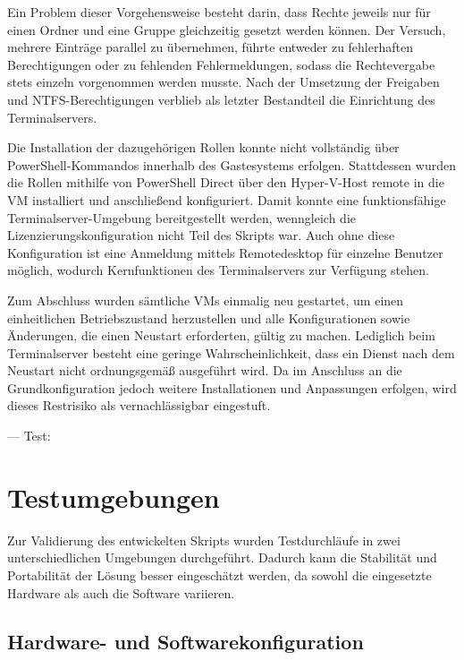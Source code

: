 \documentclass[conference]{IEEEtran}
\begin{document}
Ein Problem dieser Vorgehensweise besteht darin, dass Rechte jeweils nur für einen Ordner und eine Gruppe gleichzeitig gesetzt werden können. Der Versuch, mehrere Einträge parallel zu übernehmen, führte entweder zu fehlerhaften Berechtigungen oder zu fehlenden Fehlermeldungen, sodass die Rechtevergabe stets einzeln vorgenommen werden musste. Nach der Umsetzung der Freigaben und NTFS-Berechtigungen verblieb als letzter Bestandteil die Einrichtung des Terminalservers.

Die Installation der dazugehörigen Rollen konnte nicht vollständig über PowerShell-Kommandos innerhalb des Gastesystems erfolgen. Stattdessen wurden die Rollen mithilfe von PowerShell Direct über den Hyper-V-Host remote in die VM installiert und anschließend konfiguriert. Damit konnte eine funktionsfähige Terminalserver-Umgebung bereitgestellt werden, wenngleich die Lizenzierungskonfiguration nicht Teil des Skripts war. Auch ohne diese Konfiguration ist eine Anmeldung mittels Remotedesktop für einzelne Benutzer möglich, wodurch Kernfunktionen des Terminalservers zur Verfügung stehen.

Zum Abschluss wurden sämtliche VMs einmalig neu gestartet, um einen einheitlichen Betriebszustand herzustellen und alle Konfigurationen sowie Änderungen, die einen Neustart erforderten, gültig zu machen. Lediglich beim Terminalserver besteht eine geringe Wahrscheinlichkeit, dass ein Dienst nach dem Neustart nicht ordnungsgemäß ausgeführt wird. Da im Anschluss an die Grundkonfiguration jedoch weitere Installationen und Anpassungen erfolgen, wird dieses Restrisiko als vernachlässigbar eingestuft.

---
Test:

\chapter{Testumgebungen}

Zur Validierung des entwickelten Skripts wurden Testdurchläufe in zwei unterschiedlichen Umgebungen durchgeführt. Dadurch kann die Stabilität und Portabilität der Lösung besser eingeschätzt werden, da sowohl die eingesetzte Hardware als auch die Software variieren.

\section{Hardware- und Softwarekonfiguration}
\end{document}
